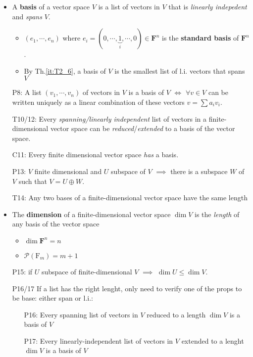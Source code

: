\documentclass[11pt,notitlepage,oneside]{article}
\DeclareMathOperator{\dimension}{dim}
\newcommand{\tref}[1]{Th.\ref{#1}}
\begin{document}
\begin{itemize}
\item A \textbf{basis} of a vector space $V$ is a list of vectors in $V$ that is \emph{linearly indepedent} and \emph{spans} $V$.
\begin{itemize}
\item $(e_1, \cdots, e_n)$ where $e_i=(0,\cdots, \underbrace{1}_{i},\cdots,0)\in\mathbf{F}^n$ is the \textbf{standard basis} of $\mathbf{F}^n$. 
\item By \tref{it:T2_6}, a basis of $V$ is the smallest list of l.i. vectors that spans $V$
\end{itemize}
\item[P8:] A list $(v_1,\cdots,v_n)$ of vectors in $V$ is a basis of $V$ $\iff$ $\forall v\in V$ can be written uniquely as a linear combination of these vectors $v=\sum a_i v_i$.
\item[T10/12:] Every \emph{spanning/linearly independent}  list of vectors in a finite-dimensional vector space can be \emph{reduced}/\emph{extended} to a basis of the vector space.
\item[C11:] Every finite dimensional vector space \emph{has} a basis.
\item[P13:] $V$ finite dimensional and $U$ subspace of $V$ $\implies$ there is a subspace $W$ of $V$ such that $V=U\oplus W$.
%
\item[T14:] Any two bases of a finite-dimensional vector space have the same length
\item The \textbf{dimension} of a finite-dimensional vector space $\dimension{V}$ is the \emph{length} of any basis of the vector space
\begin{itemize}
  \item $\dimension{\mathbf{F}^n} = n$
  \item $\mathcal{P}(\mathrm{F}_m) = m+1$
\end{itemize}
\item[P15:] if $U$  subspace of finite-dimensional $V$ $\implies$ $\dimension{U}\leq\dimension{V}$.
%
\item[P16/17] If a list has the right lenght, only need to verify one of the props to be base: either span or l.i.:
\begin{itemize}
  \item[P16:\label{it:T2_16}]Every spanning list of vectors in $V$ reduced to a length $\dimension{V}$ is a basis of $V$ 
  \item[P17:\label{it:T2_17}]Every linearly-independent list of vectors in $V$ extended to a lenght $\dimension{V}$ is a basis of $V$
\end{itemize}

\end{itemize}
\end{document}
